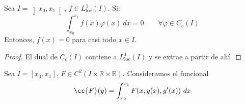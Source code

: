 \begin{lema}
    Sea $I = \left]x_0,x_1\right[$, $f\in L^1_{\text{loc}}(I)$. Si:
    \begin{equation*}
        \int_{x_0}^{x_1} f(x)\varphi(x)~dx = 0 \qquad \forall \varphi \in C_c(I)
    \end{equation*}
    Entonces, $f(x) = 0$ para casi todo $x\in I$.
    \begin{proof}
        El dual de $C_c(I)$ contiene a $L^1_{\text{loc}}(I)$ y se extrae a partir de ahí.
    \end{proof}
\end{lema}

\begin{teo}\label{teo:principal}
    Sea $I=[x_0,x_1]$, $F\in C^2(I\times\mathbb{R}\times\mathbb{R})$. Consideramos el funcional
    \begin{equation*}
        \cc{F}(y) = \int_{x_0}^{x_1} F(x,y(x),y'(x))~dx 
    \end{equation*}


\end{teo}
